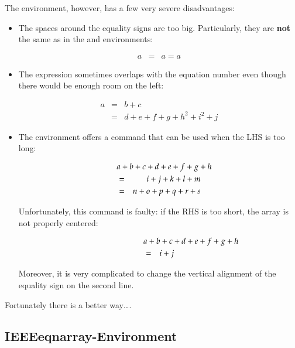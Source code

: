 The  environment, however, has a few very severe
disadvantages:
\begin{itemize}
\item The spaces around the equality signs are too big.
  Particularly, they are \textbf{not} the same as in the
   and  environments:
\begin{example}
\begin{eqnarray}
  a & = & a = a
\end{eqnarray}
\end{example}

\item The expression sometimes overlaps with the equation number even
  though there would be enough room on the left:
\begin{example}
\begin{eqnarray}
  a & = & b + c 
  \\
  & = & d + e + f + g + h^2 
  + i^2 + j 
  \label{eq:faultyeqnarray}
\end{eqnarray}
\end{example}

\item The environment offers a command  that can
  be used when the LHS is too long:
\begin{example}
\begin{eqnarray}
  \lefteqn{a + b + c + d 
    + e + f + g + h}\nonumber\\
  & = & i + j + k + l + m 
  \\
  & = & n + o + p + q + r + s
\end{eqnarray}
\end{example}
Unfortunately, this command is faulty: if the RHS is too short, the array is
not properly centered:
\begin{example}
\begin{eqnarray}
  \lefteqn{a + b + c + d 
    + e + f + g + h} 
  \nonumber \\
  & = & i + j 
\end{eqnarray}
\end{example}
Moreover, it is very complicated to change the vertical alignment of
the equality sign on the second line.
\end{itemize}

Fortunately there is a better way\ldots.


\subsection{IEEEeqnarray-Environment}
\label{sec:IEEEeqnarray_intro}

